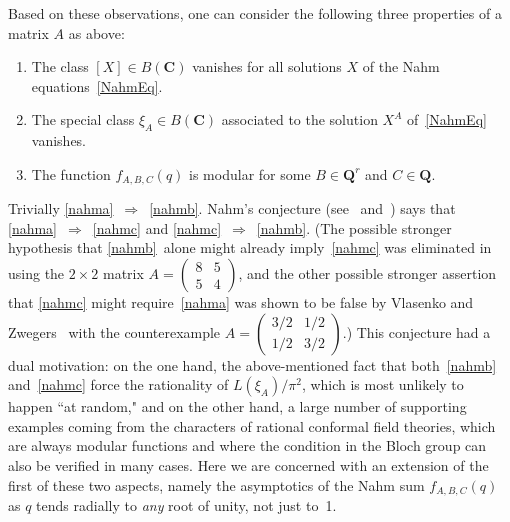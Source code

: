 \documentclass[12pt,reqno]{amsart}
\theoremstyle{definition}
\def\Q{\mathbf Q}   %
\def\C{\mathbf C}   %
\def\X{X}   %
\begin{document}
Based on these observations, one can consider the following three properties 
of a matrix $A$ as above:
\begin{enumerate}[label=(\alph*)]
 \item  \label{nahma} The class $[\X]\in B(\C)$ vanishes for all solutions $\X$ of the Nahm 
equations~\eqref{NahmEq}.
\item   \label{nahmb}  The special class $\xi_A\in B(\C)$ associated to the solution $\X^A$ 
of~\eqref{NahmEq} vanishes.
\item  \label{nahmc}  The function $f_{A,B,C}(q)$ is modular for some $B\in\Q^r$ and $C\in\Q$.
\end{enumerate}

Trivially \ref{nahma}~$\Rightarrow$~\ref{nahmb}. Nahm's conjecture (see~\cite{Nahm} 
and~\cite{Zagier}) says that \ref{nahma}~$\Rightarrow$~\ref{nahmc} and \ref{nahmc}~$\Rightarrow$~\ref{nahmb}.
(The possible stronger hypothesis that \ref{nahmb}~alone might already 
imply~\ref{nahmc} was eliminated in~\cite{Zagier} using the $2\times2$ matrix 
$A=(\begin{smallmatrix} 8 & 5 \\ 5 & 4\end{smallmatrix})$, and the other 
possible stronger assertion that \ref{nahmc} might require~\ref{nahma} was shown to be 
false by Vlasenko and Zwegers~\cite{VZ} with the counterexample 
$A=(\begin{smallmatrix} 3/2 & 1/2 \\ 1/2 & 3/2\end{smallmatrix})$.)
This conjecture had a dual motivation: on the one hand, the above-mentioned 
fact that both~\ref{nahmb} and~\ref{nahmc} force the rationality of $L(\xi_A)/\pi^2$, which 
is most unlikely to happen ``at random," and on the other hand, a large 
number of supporting examples coming from the characters of rational 
conformal field theories, which are always modular functions and where the 
condition in the Bloch group can also be verified in many cases.  Here we 
are concerned with an extension of the first of these two aspects, namely 
the asymptotics of the Nahm sum $f_{A,B,C}(q)$ as $q$ tends radially to 
{\it any} root of unity, not just to~1. 
\end{document}
